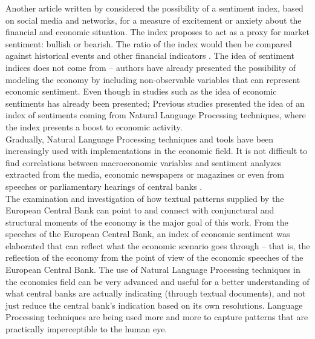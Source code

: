 Another article written by \cite{NYMAN2021104119} considered the possibility of a sentiment index, based on social media and networks, for a measure of excitement or anxiety about the financial and economic situation. The index proposes to act as a proxy for market sentiment: bullish or bearish. The ratio of the index would then be compared against historical events and other financial indicators \cite[]{NYMAN2021104119}. The idea of sentiment indices does not come from \cite{NYMAN2021104119} -- authors have already presented the possibility of modeling the economy by including non-observable variables that can represent economic sentiment. Even though in studies such as \cite{barsky2012information, angeletos2013sentiments, akerlof2010animal, gennaioli2018crisis, bholat2015text} the idea of economic sentiments has already been presented; Previous studies \cite{shapiro2020measuring, shapiro2021taking} presented the idea of an index of sentiments coming from Natural Language Processing techniques, where the index presents a boost to economic activity.\\

Gradually, Natural Language Processing techniques and tools have been increasingly used with implementations in the economic field. It is not difficult to find correlations between macroeconomic variables and sentiment analyzes extracted from the media, economic newspapers or magazines \cite[]{ostapenko2020macroeconomic, NYMAN2021104119} or even from speeches or parliamentary hearings of central banks \cite[]{fraccaroli2020central, shapiro2020measuring, shapiro2021taking}.\\

The examination and investigation of how textual patterns supplied by the European Central Bank can point to and connect with conjunctural and structural moments of the economy is the major goal of this work. From the speeches of the European Central Bank, an index of economic sentiment was elaborated that can reflect what the economic scenario goes through -- that is, the reflection of the economy from the point of view of the economic speeches of the European Central Bank. The use of Natural Language Processing techniques in the economics field can be very advanced and useful for a better understanding of what central banks are actually indicating (through textual documents), and not just reduce the central bank's indication based on its own resolutions. Language Processing techniques are being used more and more to capture patterns that are practically imperceptible to the human eye.\\

